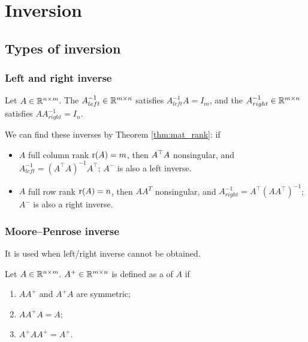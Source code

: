 \documentclass[10pt,a4paper]{book}
\begin{document}
\section{Inversion}\label{sec:mat_inv}

\subsection{Types of inversion}\label{sec:mat_inv_types}
\subsubsection{Left and right inverse}\label{sec:LR_inv}
\begin{defbox}
	\begin{definition}\label{def:LR_inv}
	Let $A\in\mathbb R^{n\times m}$. The  $A_{left}^{-1}\in\mathbb R^{m\times n}$ satisfies $A_{left}^{-1} A = I_m$, and the  $A_{right}^{-1}\in\mathbb R^{m\times n}$ satisfies $A A_{right}^{-1}=I_n$. 
	\end{definition}
	  
\end{defbox}
We can find these inverses by Theorem \ref{thm:mat_rank}: if 
\begin{itemize}
	\item $A$ full column rank $\mathrm{r}(A)=m$, then $A^\top A$ nonsingular, and $A_{left}^{-1}=(A^\top A)^{-1}A^\top$; $A^-$ is also a left inverse. 
	\item $A$ full row rank $\mathrm{r}(A)=n$, then $AA^T$ nonsingular, and $A_{right}^{-1}=A^{\top}(AA^{\top})^{-1}$; $A^-$ is also a right inverse.
\end{itemize}
   

\subsubsection{Moore--Penrose inverse}\label{sec:MP_inv}
It is used when left/right inverse cannot be obtained.
\begin{defbox}
	\begin{definition}\label{def:MP_inv}
		Let $A\in\mathbb R^{n\times m}$. $A^+\in\mathbb R^{m\times n}$ is defined as a  of $A$ if
		\begin{enumerate}
			\item $A A^+$ and $A^+ A$ are symmetric;
			\item $A A^+ A=A$;
			\item $A^+ A A^+=A^+$.    
		\end{enumerate}   
	\end{definition}
\end{defbox}
\end{document}
